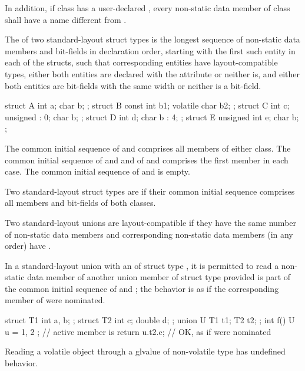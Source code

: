 \pnum
In addition, if class  has a user-declared
, every non-static data member of class
 shall have a name different from .

\pnum
The  of two standard-layout struct
types is the longest sequence of non-static data
members and bit-fields in declaration order, starting with the first
such entity in each of the structs, such that corresponding entities
have layout-compatible types,
either both entities are declared with
the  attribute
or neither is,
and either both entities are bit-fields with the same width
or neither is a bit-field.
\begin{example}
\begin{codeblock}
struct A { int a; char b; };
struct B { const int b1; volatile char b2; };
struct C { int c; unsigned : 0; char b; };
struct D { int d; char b : 4; };
struct E { unsigned int e; char b; };
\end{codeblock}
The common initial sequence of  and  comprises all members
of either class. The common initial sequence of  and  and
of  and  comprises the first member in each case.
The common initial sequence of  and  is empty.
\end{example}

\pnum
Two standard-layout struct types are
 if
their common initial sequence comprises all members and bit-fields of
both classes.

\pnum
Two standard-layout unions are layout-compatible if they
have the same number of non-static data members and corresponding
non-static data members (in any order) have .

\pnum
In a standard-layout union with an 
of struct type , it is permitted to read a non-static
data member  of another union member of struct type 
provided  is part of the common initial sequence of  and ;
the behavior is as if the corresponding member of  were nominated.
\begin{example}
\begin{codeblock}
struct T1 { int a, b; };
struct T2 { int c; double d; };
union U { T1 t1; T2 t2; };
int f() {
  U u = { { 1, 2 } };   // active member is 
  return u.t2.c;        // OK, as if  were nominated
}
\end{codeblock}
\end{example}
\begin{note}
Reading a volatile object through a glvalue of non-volatile type has
undefined behavior.
\end{note}

